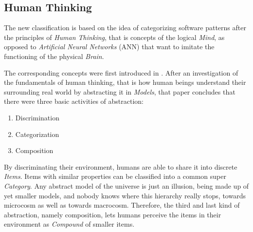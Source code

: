 %
%
%
%
%
%
%

\subsection{Human Thinking}
\label{human_thinking_heading}

The new classification is based on the idea of categorizing software patterns
after the principles of \emph{Human Thinking}, that is concepts of the logical
\emph{Mind}, as opposed to \emph{Artificial Neural Networks} (ANN) that want to
imitate the functioning of the physical \emph{Brain}.

The corresponding concepts were first introduced in \cite{heller2004}. After an
investigation of the fundamentals of human thinking, that is how human beings
understand their surrounding real world by abstracting it in \emph{Models}, that
paper concludes that there were three basic activities of abstraction:

\begin{enumerate}
    \item Discrimination
    \item Categorization
    \item Composition
\end{enumerate}

By discriminating their environment, humans are able to share it into discrete
\emph{Items}. Items with similar properties can be classified into a common super
\emph{Category}. Any abstract model of the universe is just an illusion, being
made up of yet smaller models, and nobody knows where this hierarchy really stops,
towards microcosm as well as towards macrocosm. Therefore, the third and last
kind of abstraction, namely composition, lets humans perceive the items in their
environment as \emph{Compound} of smaller items.

